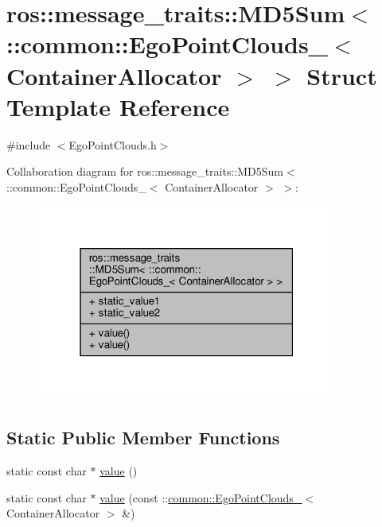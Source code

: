 \hypertarget{structros_1_1message__traits_1_1MD5Sum_3_01_1_1common_1_1EgoPointClouds___3_01ContainerAllocator_01_4_01_4}{}\section{ros\+:\+:message\+\_\+traits\+:\+:M\+D5\+Sum$<$ \+:\+:common\+:\+:Ego\+Point\+Clouds\+\_\+$<$ Container\+Allocator $>$ $>$ Struct Template Reference}
\label{structros_1_1message__traits_1_1MD5Sum_3_01_1_1common_1_1EgoPointClouds___3_01ContainerAllocator_01_4_01_4}


{\ttfamily \#include $<$Ego\+Point\+Clouds.\+h$>$}



Collaboration diagram for ros\+:\+:message\+\_\+traits\+:\+:M\+D5\+Sum$<$ \+:\+:common\+:\+:Ego\+Point\+Clouds\+\_\+$<$ Container\+Allocator $>$ $>$\+:\nopagebreak
\begin{figure}[H]
\begin{center}
\leavevmode
\includegraphics[width=280pt]{d1/da4/structros_1_1message__traits_1_1MD5Sum_3_01_1_1common_1_1EgoPointClouds___3_01ContainerAllocator_01_4_01_4__coll__graph}
\end{center}
\end{figure}
\subsection*{Static Public Member Functions}
\begin{DoxyCompactItemize}
\item 
static const char $\ast$ \hyperlink{structros_1_1message__traits_1_1MD5Sum_3_01_1_1common_1_1EgoPointClouds___3_01ContainerAllocator_01_4_01_4_a43f333543bc9747769fc141be6c2b8ae}{value} ()
\item 
static const char $\ast$ \hyperlink{structros_1_1message__traits_1_1MD5Sum_3_01_1_1common_1_1EgoPointClouds___3_01ContainerAllocator_01_4_01_4_a8f85137cf19ea8031addb72b5eae5077}{value} (const \+::\hyperlink{structcommon_1_1EgoPointClouds__}{common\+::\+Ego\+Point\+Clouds\+\_\+}$<$ Container\+Allocator $>$ \&)
\end{DoxyCompactItemize}
